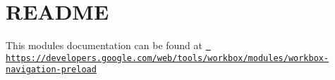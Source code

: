 \chapter{README}
\hypertarget{md_pkiclassroomrescheduler_2src_2main_2frontend_2node__modules_2workbox-navigation-preload_2_r_e_a_d_m_e}{}\label{md_pkiclassroomrescheduler_2src_2main_2frontend_2node__modules_2workbox-navigation-preload_2_r_e_a_d_m_e}
This module\textquotesingle{}s documentation can be found at \href{https://developers.google.com/web/tools/workbox/modules/workbox-navigation-preload}{\texttt{ https\+://developers.\+google.\+com/web/tools/workbox/modules/workbox-\/navigation-\/preload}} 